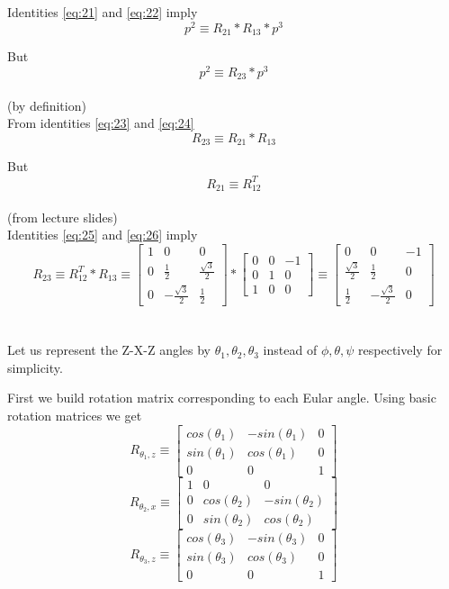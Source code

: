 \documentclass[12pt]{article}
\newcommand{\fromslides}{{\\ \color{blue} \hspace*{\fill}(from lecture slides)} \\}
\newcommand{\bydefn}{{\\ \color{blue} \hspace*{\fill}(by definition)} \\}
\newcommand{\rx}[1]{\begin{bmatrix} 1 & 0 & 0 \\ 0 & cos(#1) & -sin(#1) \\ 0 & sin(#1) & cos(#1) \end{bmatrix}}
\newcommand{\rz}[1]{\begin{bmatrix} cos(#1) & -sin(#1) & 0 \\ sin(#1) & cos(#1) & 0 \\ 0 & 0 & 1 \end{bmatrix}}
\begin{document}
Identities \ref{eq:21} and \ref{eq:22} imply
\begin{equation}
  \label{eq:23}
  p^{2} \equiv R_{21} * R_{13} * p^{3}
\end{equation}

But
\begin{equation}
  \label{eq:24}
  p^{2} \equiv R_{23} * p^{3}
\end{equation}
\bydefn

From identities \ref{eq:23} and \ref{eq:24}
\begin{equation}
  \label{eq:25}
  R_{23} \equiv R_{21} * R_{13}
\end{equation}

But
\begin{equation}
  \label{eq:26}
  R_{21} \equiv R_{12}^{T}
\end{equation}
\fromslides

Identities \ref{eq:25} and \ref{eq:26} imply
\begin{equation}
  \label{eq:27}
  R_{23} \equiv R_{12}^T * R_{13}
  \equiv \begin{bmatrix} 1 & 0 & 0 \\ 0 & \frac{1}{2} & \frac{\sqrt{3}}{2} \\ 0 & -\frac{\sqrt{3}}{2} & \frac{1}{2} \end{bmatrix} * \begin{bmatrix} 0 & 0 & -1 \\ 0 & 1 & 0 \\ 1 & 0 & 0 \end{bmatrix}
  \equiv \begin{bmatrix} 0 & 0 & -1 \\ \frac{\sqrt{3}}{2} & \frac{1}{2} & 0 \\ \frac{1}{2} & -\frac{\sqrt{3}}{2} & 0 \end{bmatrix}
\end{equation}

\pagebreak
\section{}

Let us represent the Z-X-Z angles by $ \theta_1, \theta_2, \theta_3 $ instead of $ \phi, \theta, \psi $ respectively for simplicity.

First we build rotation matrix corresponding to each Eular angle.
Using basic rotation matrices we get
\begin{equation}
  \label{eq:31}
  R_{\theta_1,z} \equiv \rz{\theta_1}
\end{equation}
\begin{equation}
  \label{eq:32}
  R_{\theta_2,x} \equiv \rx{\theta_2}
\end{equation}
\begin{equation}
  \label{eq:33}
  R_{\theta_3,z} \equiv \rz{\theta_3}
\end{equation}
\end{document}
